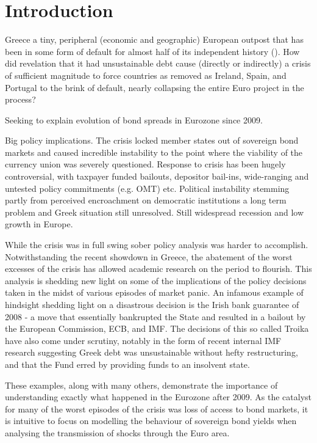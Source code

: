 \documentclass[/../base.tex]{subfiles}
\begin{document}
\section{Introduction}

Greece a tiny, peripheral (economic and geographic) European outpost that has been in some form of default for almost half of its independent history (\cite{kalyvas2015modern}). How did revelation that it had unsustainable debt cause (directly or indirectly) a crisis of sufficient magnitude to force countries as removed as Ireland, Spain, and Portugal to the brink of default, nearly collapsing the entire Euro project in the process? 

Seeking to explain evolution of bond spreads in Eurozone since 2009.

\cite{whelan2013sovereign}

Big policy implications. The crisis locked member states out of sovereign bond markets and caused incredible instability to the point where the viability of the currency union was severely questioned. Response to crisis has been hugely controversial, with taxpayer funded bailouts, depositor bail-ins, wide-ranging and untested policy commitments (e.g. OMT) etc. Political instability stemming partly from perceived encroachment on democratic institutions a long term problem and Greek situation still unresolved. Still widespread recession and low growth in Europe.  

While the crisis was in full swing sober policy analysis was harder to accomplish. Notwithstanding the recent showdown in Greece, the abatement of the worst excesses of the crisis has allowed academic research on the period to flourish. This analysis is shedding new light on some of the implications of the policy decisions taken in the midst of various episodes of market panic. An infamous example of hindsight shedding light on a disastrous decision is the Irish bank guarantee of 2008 - a move that essentially bankrupted the State and resulted in a bailout by the European Commission, ECB, and IMF. The decisions of this so called Troika have also come under scrutiny, notably in the form of recent internal IMF research suggesting Greek debt was unsustainable without hefty restructuring, and that the Fund erred by providing funds to an insolvent state. 

These examples, along with many others, demonstrate the importance of understanding exactly what happened in the Eurozone after 2009. As the catalyst for many of the worst episodes of the crisis was loss of access to bond markets, it is intuitive to focus on modelling the behaviour of sovereign bond yields when analysing the transmission of shocks through the Euro area. 
\end{document}
